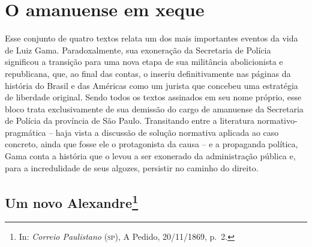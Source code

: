 \part{O amanuense em xeque} %

\begin{argumento}
Esse conjunto de quatro textos relata um dos mais importantes eventos da
vida de Luiz Gama. Paradoxalmente, sua exoneração da Secretaria de
Polícia significou a transição para uma nova etapa de sua militância
abolicionista e republicana, que, ao final das contas, o inseriu
definitivamente nas páginas da história do Brasil e das Américas como um
jurista que concebeu uma estratégia de liberdade original. Sendo todos
os textos assinados em seu nome próprio, esse bloco trata exclusivamente
de sua demissão do cargo de amanuense da Secretaria de Polícia da
província de São Paulo. Transitando entre a literatura
normativo-pragmática -- haja vista a discussão de solução normativa
aplicada ao caso concreto, ainda que fosse ele o protagonista da causa
-- e a propaganda política, Gama conta a história que o levou a ser
exonerado da administração pública e, para a incredulidade de seus
algozes, persistir no caminho do direito.
\end{argumento}

\chapter{Um novo Alexandre\footnote{In: \emph{Correio Paulistano} (\textsc{sp}), A
  Pedido, 20/11/1869, p.~2.}}

